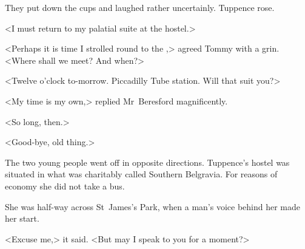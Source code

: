 They put down the cups and laughed rather uncertainly. Tuppence rose.

<I must return to my palatial suite at the hostel.>

<Perhaps it is time I strolled round to the ,> agreed Tommy with a grin. <Where shall we meet? And when?>

<Twelve o'clock to-morrow. Piccadilly Tube station. Will that suit you?>

<My time is my own,> replied Mr~Beresford magnificently.

<So long, then.>

<Good-bye, old thing.>

The two young people went off in opposite directions. Tuppence's hostel was situated in what was charitably called Southern Belgravia. For reasons of economy she did not take a bus.

She was half-way across St~James's Park, when a man's voice behind her made her start.

<Excuse me,> it said. <But may I speak to you for a moment?> 